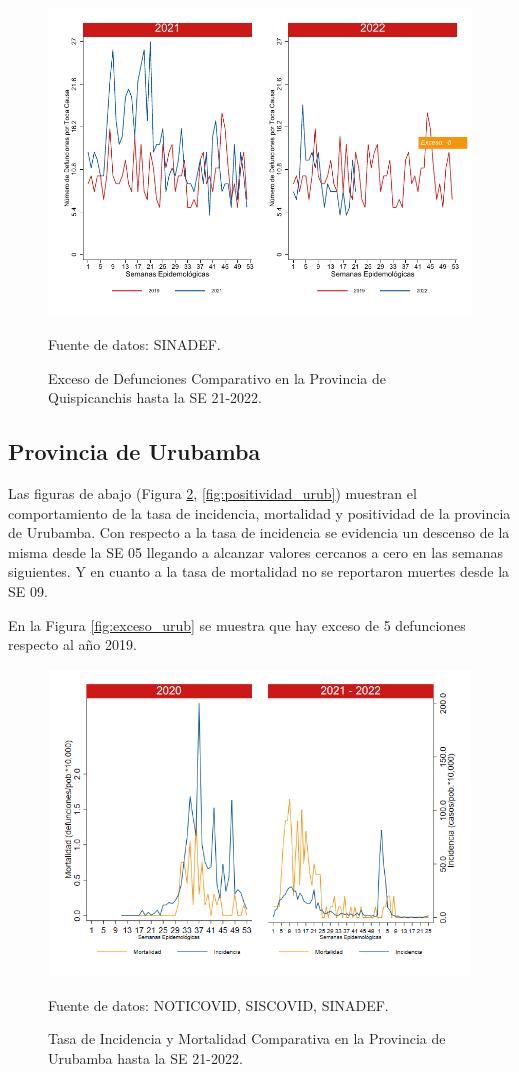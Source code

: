 \documentclass[12pt,a4paper,openany]{book}
\begin{document}
	\begin{figure}[h]
		\caption{Exceso de Defunciones Comparativo en la Provincia de Quispicanchis hasta la SE 21-2022.}\label{fig:exceso_quisp}
		\begin{center}
			\includegraphics[width=0.7\linewidth]{../figuras/exceso_12.pdf}
		\end{center}
		{\footnotesize {Fuente de datos: SINADEF.}}
	\end{figure}
	
	\clearpage
	
	\subsection*{Provincia de Urubamba}
	\noindent Las figuras de abajo (Figura \ref{fig:inc_urub}, \ref{fig:positividad_urub}) muestran el comportamiento de la tasa de incidencia, mortalidad y positividad de la provincia de Urubamba. Con respecto a la tasa de incidencia se evidencia un descenso de la misma desde la SE 05 llegando a alcanzar valores cercanos a cero en las semanas siguientes. Y en cuanto a la tasa de mortalidad no se reportaron muertes desde la SE 09. 
	
	En la Figura \ref{fig:exceso_urub} se muestra que hay exceso de 5 defunciones respecto al año 2019.
	
	\begin{figure}[h]
		\caption{Tasa de Incidencia y Mortalidad Comparativa en la Provincia de Urubamba hasta la SE 21-2022.}\label{fig:inc_urub}
		\begin{center}
			\includegraphics[width=0.85\linewidth]{../figuras/incidencia_mortalidad_20_21_13.png}
		\end{center}
		{\footnotesize {Fuente de datos: NOTICOVID, SISCOVID, SINADEF.}}
	\end{figure}
	
\end{document}
